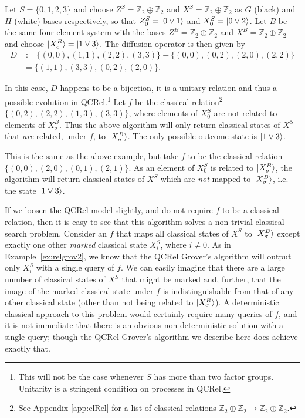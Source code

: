 \begin{example}
Let $S=\{0,1,2,3\}$ and choose $Z^S=\mathbb{Z}_2\oplus\mathbb{Z}_2$ and $X^S=\mathbb{Z}_2\oplus\mathbb{Z}_2$ as $G$ (black) and $H$ (white) bases respectively, so that $Z^{S}_0=| 0\vee 1 \rangle$ and $X^S_0 = | 0\vee 2 \rangle$. Let $B$ be the same four element system with the bases $Z^B=\mathbb{Z}_2\oplus\mathbb{Z}_2$ and $X^B=\mathbb{Z}_2\oplus\mathbb{Z}_2$ and choose $| X_{\sigma}^B \rangle=| 1\vee 3 \rangle$. The diffusion operator is then given by
\begin{align*}
D &:= \{(0,0),(1,1),(2,2),(3,3)\}-\{(0,0),(0,2),(2,0),(2,2)\}
\\&=\{(1,1),(3,3),(0,2),(2,0)\}.
\end{align*}

In this case, $D$ happens to be a bijection, it is a unitary relation and thus a possible evolution in QCRel.\footnote{This will not be the case whenever $S$ has more than two factor groups. Unitarity is a stringent condition on processes in QCRel.} Let $f$ be the classical relation\footnote{See Appendix \ref{app:clRel} for a list of classical relations $\mathbb{Z}_2\oplus\mathbb{Z}_2\to\mathbb{Z}_2\oplus\mathbb{Z}_2$.} $\{(0,2),(2,2),(1,3),(3,3)\}$, where elements of $X^S_0$ are not related to elements of $X_{\sigma}^B$. Thus the above algorithm will only return classical states of $X^{S}$ that \textit{are} related, under $f$, to $| X_{\sigma}^B \rangle$.  The only possible outcome state is $| 1\vee 3 \rangle$.
\end{example}

\begin{example}
\label{ex:relgrov2}
This is the same as the above example, but take $f$ to be the classical relation $\{(0,0),(2,0),(0,1),(2,1)\}$. As an element of $X^S_0$ is related to $| X_{\sigma}^B \rangle$, the algorithm will return classical states of $X^S$ which are \emph{not} mapped to $| X_{\sigma}^B \rangle$, i.e. the state $| 1\vee3 \rangle$.
\end{example}

If we loosen the QCRel model slightly, and do not require $f$ to be a classical relation, then it is easy to see that this algorithm solves a non-trivial classical search problem. Consider an $f$ that maps all classical states of $X^S$ to $| X_{\sigma}^B \rangle$  except exactly one other \emph{marked} classical state $X^S_i$, where $i\neq 0$. As in Example~\ref{ex:relgrov2}, we know that the QCRel Grover's algorithm will output only $X_i^S$ with a single query of $f$. We can easily imagine that there are a large number of classical states of $X^S$ that might be marked and, further, that the image of the marked classical state under $f$  is indistinguishable from that of any other classical state (other than not being related to $| X_{\sigma}^B \rangle$). A deterministic classical approach to this problem would certainly require many queries of $f$, and it is not immediate that there is an obvious non-deterministic solution with a single query; though the QCRel Grover's algorithm we describe here does achieve exactly that.

